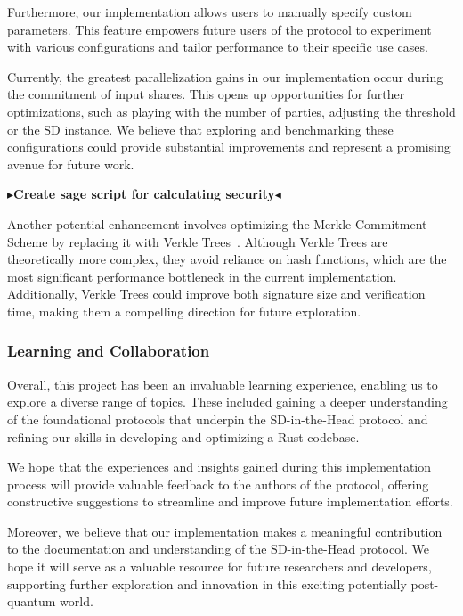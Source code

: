 \documentclass[11pt]{report}
\theoremstyle{definition}
\theoremstyle{plain}
\newcommand{\todo}[1]{{\color[rgb]{.5,0,0}\textbf{$\blacktriangleright$#1$\blacktriangleleft$}}}
\begin{document}
Furthermore, our implementation allows users to manually specify custom parameters. This feature empowers future users of the protocol to experiment with various configurations and tailor performance to their specific use cases. 

Currently, the greatest parallelization gains in our implementation occur during the commitment of input shares. This opens up opportunities for further optimizations, such as playing with the number of parties, adjusting the threshold or the SD instance. We believe that exploring and benchmarking these configurations could provide substantial improvements and represent a promising avenue for future work.

\todo{Create sage script for calculating security}

Another potential enhancement involves optimizing the Merkle Commitment Scheme by replacing it with Verkle Trees~\cite{kuszmaul2019verkle, iavich2023verkle}. Although Verkle Trees are theoretically more complex, they avoid reliance on hash functions, which are the most significant performance bottleneck in the current implementation. Additionally, Verkle Trees could improve both signature size and verification time, making them a compelling direction for future exploration.

\subsubsection{Learning and Collaboration}
Overall, this project has been an invaluable learning experience, enabling us to explore a diverse range of topics. These included gaining a deeper understanding of the foundational protocols that underpin the SD-in-the-Head protocol and refining our skills in developing and optimizing a Rust codebase.

We hope that the experiences and insights gained during this implementation process will provide valuable feedback to the authors of the protocol, offering constructive suggestions to streamline and improve future implementation efforts.

Moreover, we believe that our implementation makes a meaningful contribution to the documentation and understanding of the SD-in-the-Head protocol. We hope it will serve as a valuable resource for future researchers and developers, supporting further exploration and innovation in this exciting potentially post-quantum world.


\end{document}

